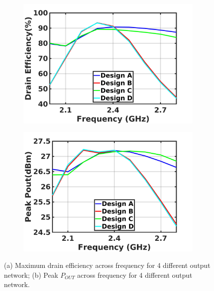 \documentclass[conference]{IEEEtran}
\begin{document}
\begin{figure}[!t]
\captionsetup{font=footnotesize}
\centering
\begin{subfigure}{0.24\textwidth}
\centering
\includegraphics[width=1\textwidth]{Images/Output_Network_Comp/Comp_DE.jpg}
\caption{}
\label{fig:Comp_DE}
\end{subfigure}
\begin{subfigure}{0.24\textwidth}
\includegraphics[width=1\textwidth]{Images/Output_Network_Comp/Comp_Pout.jpg}
\caption{}
\label{fig:Comp_Pout}
\end{subfigure}
\caption{(a) Maximum drain efficiency across frequency for 4 different output network; (b) Peak $P_{OUT}$ across frequency for 4 different output network.}
\label{fig:Comp_Pout_DE}
\vspace{-0.25in}
\end{figure}
\end{document}
